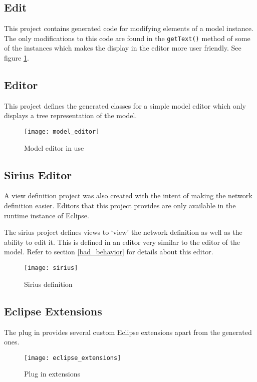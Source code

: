 \subsection{Edit}
This project contains generated code for modifying elements of a model instance. The only
modifications to this code are found in the \texttt{getText()} method of some of the instances
which makes the display in the editor more user friendly. See figure \ref{fig:model_editor}.

\subsection{Editor}
This project defines the generated classes for a simple model editor which
only displays a tree representation of the model.
\begin{figure}[H]
    \centering
    \texttt{[image: model\_editor]}
    \caption{Model editor in use}
    \label{fig:model_editor}
\end{figure}

\subsection{Sirius Editor}
A view definition project was also created with the intent of making the network
definition easier. Editors that this project provides are only available in the 
runtime instance of Eclipse.

The sirius project defines views to `view' the network definition as well as the ability to edit it.
This is defined in an editor very similar to the editor of the model.
Refer to section \ref{bad_behavior} for details about this editor.
\begin{figure}[H]
    \centering
    \texttt{[image: sirius]}
    \caption{Sirius definition}
\end{figure}

\subsection{Eclipse Extensions}
The plug in provides several custom Eclipse extensions apart from the generated ones.
\begin{figure}[H]
    \centering
    \texttt{[image: eclipse\_extensions]}
    \caption{Plug in extensions}
    \label{fig:eclipse_extensions}
\end{figure}

